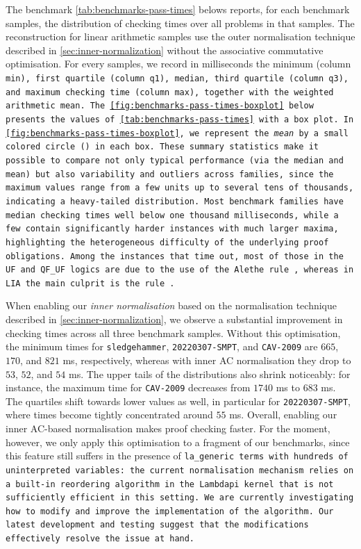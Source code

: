 The benchmark \cref{tab:benchmarks-pass-times} belows reports, for each benchmark samples, the distribution of checking times over all problems in that samples.
The reconstruction for linear arithmetic samples use the outer normalisation technique described in \cref{sec:inner-normalization} without the associative commutative optimisation.
For every samples, we record in milliseconds the minimum (column \tt{min}), first quartile (column q1), median, third quartile (column q3), and maximum checking time (column \tt{max}), together with the weighted arithmetic mean.
The \cref{fig:benchmarks-pass-times-boxplot} below presents the values of \cref{tab:benchmarks-pass-times} with a box plot.
In \cref{fig:benchmarks-pass-times-boxplot}, we represent the \emph{mean} by a small colored circle ({\color{RoyalBlue}\textbullet}) in each box.
These summary statistics make it possible to compare not only typical performance (via the median and mean) but also variability and outliers across families, since the maximum values range from a few units up to several tens of thousands, indicating a heavy-tailed distribution.
Most benchmark families have median checking times well below one thousand milliseconds, while a few contain significantly harder instances with much larger maxima, highlighting the heterogeneous difficulty of the underlying proof obligations.
Among the instances that time out, most of those in the \tt{UF} and \tt{QF\_UF} logics are due to the use of the Alethe rule , whereas in \tt{LIA} the main culprit is the rule .



When enabling our \emph{inner normalisation} based on the  normalisation technique described in \cref{sec:inner-normalization}, we observe a substantial improvement in checking times across all three benchmark samples.
Without this optimisation, the minimum times for \texttt{sledgehammer}, \texttt{20220307-SMPT}, and \texttt{CAV-2009} are $665$, $170$, and $821$ ms, respectively, whereas with inner AC normalisation they drop to $53$, $52$, and $54$ ms.
The upper tails of the distributions also shrink noticeably: for instance, the maximum time for \texttt{CAV-2009} decreases from $1740$ ms to $683$ ms.
The quartiles shift towards lower values as well, in particular for \texttt{20220307-SMPT}, where times become tightly concentrated around $55$ ms.
Overall, enabling our inner AC-based normalisation makes proof checking faster.
For the moment, however, we only apply this optimisation to a fragment of our benchmarks, since this feature still suffers in the presence of \tt{la\_generic} terms with hundreds of uninterpreted variables: the current normalisation mechanism relies on a built-in reordering algorithm in the Lambdapi kernel that is not sufficiently efficient in this setting.
We are currently investigating how to modify and improve the implementation of the  algorithm.
Our latest development and testing suggest that the modifications effectively resolve the issue at hand.

